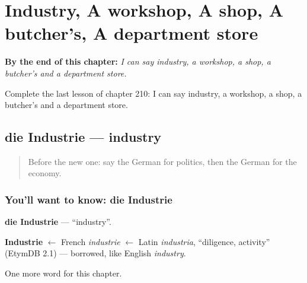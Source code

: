 
\chapter{Industry, A workshop, A shop, A butcher's, A department store}
\label{ch:ge-industry-a-workshop-a-shop-a-butcher-s-a-department-store}

\begin{chapteropening}
\textbf{By the end of this chapter:} \emph{I can say industry, a workshop, a shop, a butcher's and a department store.}

Complete the last lesson of chapter 210: I can say industry, a workshop, a shop, a butcher's and a department store.
\end{chapteropening}

\section[die Industrie]{die Industrie — industry}

\label{lesson:GE-C210-industrie}



\begin{quote}
Before the new one: say the German for politics, then the German for the economy.
\end{quote}

\subsection*{You'll want to know: die Industrie}
\textbf{die Industrie} — \textquotedblleft{}industry\textquotedblright{}.

\begin{cousinweb}
\textbf{Industrie} $\leftarrow$ French \emph{industrie} $\leftarrow$ Latin \emph{industria}, \textquotedblleft{}diligence, activity\textquotedblright{} (EtymDB 2.1) — borrowed, like English \emph{industry}.
\end{cousinweb}

\begin{grammarlens}[title={What you've built}]
One more word for this chapter.
\end{grammarlens}

